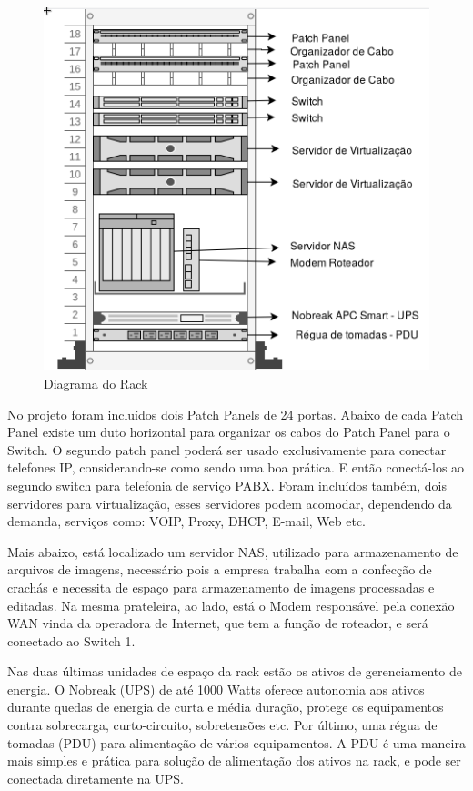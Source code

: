 \documentclass[	DIV=calc,%
							paper=a4,%
							fontsize=12pt,%
							onecolumn]{scrartcl}	 					%
\begin{document}
\begin{figure}[H]
	\centering
	\includegraphics[width=\textwidth]{rack}
	\caption{Diagrama do Rack}
	\label{diagrama-do-rack}
\end{figure}

No projeto foram incluídos dois Patch Panels de 24 portas. Abaixo de cada Patch Panel existe um duto horizontal para organizar os cabos do Patch Panel para o Switch. O segundo patch panel poderá ser usado exclusivamente para conectar telefones IP, considerando-se como sendo uma boa prática. E então conectá-los ao segundo switch para telefonia de serviço PABX. Foram incluídos também, dois servidores para virtualização, esses servidores podem acomodar, dependendo da demanda, serviços como: VOIP, Proxy, DHCP, E-mail, Web etc.

Mais abaixo, está localizado um servidor NAS, utilizado para armazenamento de arquivos de imagens, necessário pois a empresa trabalha com a confecção de crachás e necessita de espaço para armazenamento de imagens processadas e editadas. Na mesma prateleira, ao lado, está o Modem responsável pela conexão WAN vinda da operadora de Internet, que tem a função de roteador, e será conectado ao Switch 1.

Nas duas últimas unidades de espaço da rack estão os ativos de gerenciamento de energia. O Nobreak (UPS) de até 1000 Watts oferece autonomia aos ativos durante quedas de energia de curta e média duração, protege os equipamentos contra sobrecarga, curto-circuito, sobretensões etc. Por último, uma régua de tomadas (PDU) para alimentação de vários equipamentos. A PDU é uma maneira mais simples e prática para solução de alimentação dos ativos na rack, e pode ser conectada diretamente na UPS.
\end{document}
